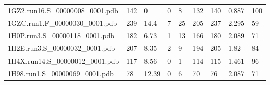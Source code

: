 \documentclass{bioinfo}
\begin{document}
\begin{table}[!t]
{\begin{tabular}{lllllllll}
    1GZ2.run16.S\_00000008\_0001.pdb & 142      & 0          & 0           & 8           & 132         & 140     & 0.887           & 100          \\
    1GZC.run1.F\_00000030\_0001.pdb & 239      & 14.4       & 7           & 25          & 205         & 237     & 2.295           & 59           \\
    1H0P.run3.S\_00000118\_0001.pdb & 182      & 6.73       & 1           & 13          & 166         & 180     & 2.089           & 71           \\
    1H2E.run3.S\_00000032\_0001.pdb & 207      & 8.35       & 2           & 9           & 194         & 205     & 1.82            & 84           \\
    1H4X.run14.S\_00000012\_0001.pdb & 117      & 8.56       & 0           & 1           & 114         & 115     & 1.461           & 96           \\
    1H98.run1.S\_00000069\_0001.pdb & 78       & 12.39      & 0           & 6           & 70          & 76      & 2.087           & 71           \\
\end{tabular}}{}
\end{table}
\end{document}
